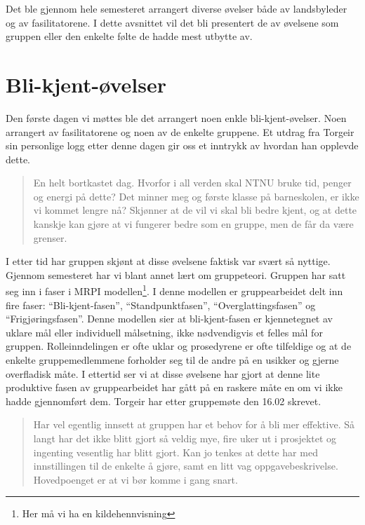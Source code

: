 Det ble gjennom hele semesteret arrangert diverse øvelser både av landsbyleder og av fasilitatorene. 
I dette avsnittet vil det bli presentert de av øvelsene som gruppen eller den enkelte følte de hadde mest utbytte av.

\section{Bli-kjent-øvelser}
Den første dagen vi møttes ble det arrangert noen enkle bli-kjent-øvelser. 
Noen arrangert av fasilitatorene og noen av de enkelte gruppene. 
Et utdrag fra Torgeir sin personlige logg etter denne dagen gir oss et inntrykk av hvordan han opplevde dette.

\begin{quote}
En helt bortkastet dag. Hvorfor i all verden skal NTNU bruke tid, penger og energi på dette? 
Det minner meg og første klasse på barneskolen, er ikke vi kommet lengre nå? 
Skjønner at de vil vi skal bli bedre kjent, og at dette kanskje kan gjøre at vi fungerer bedre som en gruppe, men de får da være grenser. 
\end{quote}

I etter tid har gruppen skjønt at disse øvelsene faktisk var svært så nyttige. 
Gjennom semesteret har vi blant annet lært om gruppeteori. 
Gruppen har satt seg inn i faser i MRPI modellen\footnote{Her må vi ha en kildehennvisning}.
I denne modellen er gruppearbeidet delt inn fire faser: 
“Bli-kjent-fasen”, “Standpunktfasen”, “Overglattingsfasen” og “Frigjøringsfasen”. 
Denne modellen sier at bli-kjent-fasen er kjennetegnet av uklare mål eller individuell målsetning, 
ikke nødvendigvis et felles mål for gruppen. 
Rolleinndelingen er ofte uklar og prosedyrene er ofte tilfeldige og at de enkelte gruppemedlemmene forholder seg til de andre på en usikker og gjerne overfladisk måte.
I ettertid ser vi at disse øvelsene har gjort at denne lite produktive fasen av gruppearbeidet har gått på en raskere måte en om vi ikke hadde gjennomført dem. 
Torgeir har etter gruppemøte den 16.02 skrevet.

\begin{quote}
Har vel egentlig innsett at gruppen har et behov for å bli mer effektive. 
Så langt har det ikke blitt gjort så veldig mye, fire uker ut i prosjektet og ingenting vesentlig har blitt gjort. 
Kan jo tenkes at dette har med innstillingen til de enkelte å gjøre, samt en litt vag oppgavebeskrivelse. 
Hovedpoenget er at vi bør komme i gang snart. 
\end{quote}

